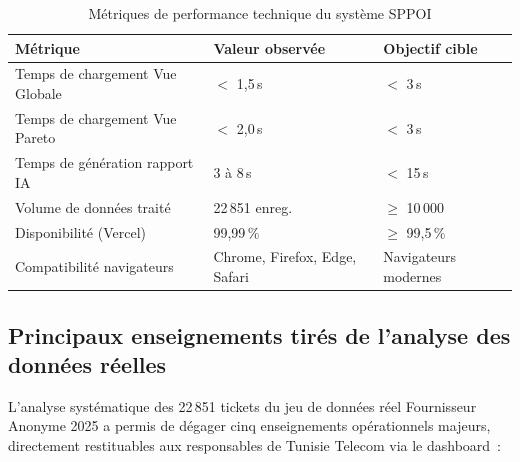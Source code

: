 \documentclass[10pt,a4paper]{report}
\begin{document}
\begin{table}[H]
\centering
\caption{Métriques de performance technique du système SPPOI}
\begin{tabularx}{\textwidth}{L{5.5cm} C{3.5cm} C{3.5cm}}
\toprule
{}
\textbf{\color{ttblue}Métrique} & \textbf{\color{ttblue}Valeur observée} & \textbf{\color{ttblue}Objectif cible} \\
\midrule
Temps de chargement Vue Globale   & $<$ 1,5\,s   & $<$ 3\,s \\
Temps de chargement Vue Pareto    & $<$ 2,0\,s   & $<$ 3\,s \\
Temps de génération rapport IA    & 3 à 8\,s     & $<$ 15\,s \\
Volume de données traité          & 22\,851 enreg. & $\geq$ 10\,000 \\
Disponibilité (Vercel)            & 99,99\,\%    & $\geq$ 99,5\,\% \\
Compatibilité navigateurs         & Chrome, Firefox, Edge, Safari & Navigateurs modernes \\
\bottomrule
\end{tabularx}
\label{tab:perf-tech}
\end{table}

\subsection{Principaux enseignements tirés de l'analyse des données réelles}

L'analyse systématique des 22\,851 tickets du jeu de données réel Fournisseur Anonyme 2025 a permis de dégager cinq enseignements opérationnels majeurs, directement restituables aux responsables de Tunisie Telecom via le dashboard~:
\end{document}
